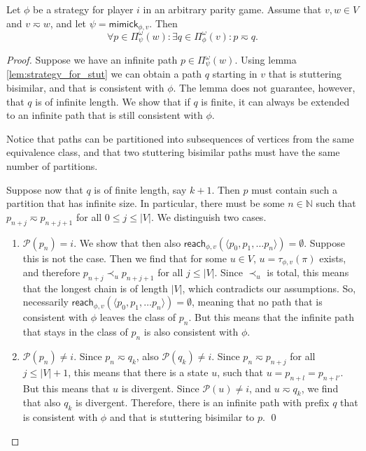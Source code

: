 \documentclass[a4paper]{llncs}
\newcommand{\N}{\ensuremath{\mathbb{N}}\xspace}
\newcommand{\getplayername}{\ensuremath{\mathcal{P}}}
\newcommand{\getplayer}[1]{\getplayername(#1)}
\newcommand{\prefixes}[3][]{\ensuremath{\Pi_{#2}^{#1}(#3)}}
\newcommand{\path}[1]{\ensuremath{\langle #1 \rangle}}
\newcommand{\mimick}{\mathsf{mimick}_{\phi,v}}
\newcommand{\stut}{\eqsim}\newcommand{\semistut}{\sim_{\mathrm{semi-st}}}
\newcommand{\entry}[2]{\mathsf{reach}_{#1}(#2)}
\newcommand{\targetorder}[1]{\ensuremath{\prec_{#1}}}
\newcommand{\target}[2]{\tau_{#1}(#2)}
\begin{document}
\begin{lemma}\label{lem:strategy_for_stut_infinite}
Let $\phi$ be a strategy for player $i$ in an arbitrary parity game. Assume that $v, w \in V$ and $v \stut w$, and let $\psi=\mimick$. Then
$$
  \forall p \in \prefixes[\omega]{\psi}{w}:
  \exists q \in \prefixes[\omega]{\phi}{v}:
  p \stut q.
$$
\end{lemma}
\begin{proof}
  Suppose we have an infinite path $p \in \prefixes[\omega]{\psi}{w}$. Using lemma \ref{lem:strategy_for_stut} we can obtain a path $q$ starting in $v$ that is stuttering bisimilar, and that is consistent with $\phi$. The lemma does not guarantee, however, that $q$ is of infinite length. We show that if $q$ is finite, it can always be extended to an infinite path that is still consistent with $\phi$.

  Notice that paths can be partitioned into subsequences of vertices
  from the same equivalence class, and that two stuttering bisimilar
  paths must have the same number of partitions.

  Suppose now that $q$ is of finite length, say $k+1$. Then $p$ must
  contain such a partition that has infinite size. In particular, there
  must be some $n\in\N$ such that $p_{n+j} \stut p_{n+j+1}$ for all $0
  \le j \le |V|$. We distinguish two cases.

  \begin{enumerate}
    \item $\getplayer{p_n} = i$. We show that then also $\entry{\phi,v}{\path{p_0, p_1, \ldots p_n}}
    = \emptyset$. Suppose this is not the case. Then we find that for some $u \in V$, 
    $u = \target{\phi,v}{\pi}$ exists, and therefore $p_{n+j} \targetorder{u} 
    p_{n+j+1}$ for all $j \le |V|$. Since $\targetorder{u}$ is total, this means that 
    the longest chain is of length $|V|$, which contradicts our assumptions. So, 
    necessarily $\entry{\phi,v}{\path{p_0, p_1, \ldots p_n}} = \emptyset$, meaning that no
    path that is consistent with $\phi$ leaves the class of $p_n$. But this means that
    the infinite path that stays in the class of $p_n$ is also consistent with $\phi$.

    \item $\getplayer{p_n} \neq i$. Since $p_n \stut q_k$, also $\getplayer{q_k} \neq i$.
    Since $p_n \stut p_{n+j}$ for all $j \le |V| +1$, this means that
    there is a state $u$, such that $u = p_{n+l} = p_{n+l'}$.  But this
    means that $u$ is divergent. Since $\getplayer{u} \neq i$, and $u \stut q_k$,
    we find that also $q_k$ is divergent. Therefore, there is an infinite
    path with prefix $q$ that is consistent with $\phi$ and that
    is stuttering bisimilar to $p$. \qed
  \end{enumerate}
\end{proof}
\end{document}
